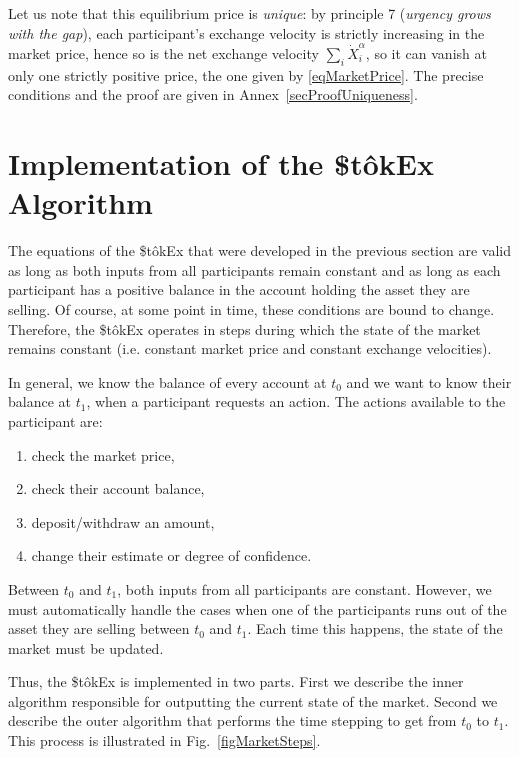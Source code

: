 \documentclass[letterpaper]{article}
\newcommand{\StokEx}{\$t\^{o}kEx}
\begin{document}
Let us note that this equilibrium price is \emph{unique}: by principle 7 (\emph{urgency grows with the gap}), each participant's exchange velocity is strictly increasing in the market price, hence so is the net exchange velocity $\sum_i \dot{X}_i^\alpha$, so it can vanish at only one strictly positive price, the one given by \eqref{eqMarketPrice}. The precise conditions and the proof are given in Annex~\ref{secProofUniqueness}.

\clearpage
\section{Implementation of the \StokEx{} Algorithm}

The equations of the \StokEx{} that were developed in the previous section are valid as long as both inputs from all participants remain constant and as long as each participant has a positive balance in the account holding the asset they are selling. Of course, at some point in time, these conditions are bound to change. Therefore, the \StokEx{} operates in steps during which the state of the market remains constant (i.e. constant market price and constant exchange velocities).

In general, we know the balance of every account at $t_0$ and we want to know their balance at $t_1$, when a participant requests an action. The actions available to the participant are:
\begin{enumerate}
    \item check the market price,
    \item check their account balance,
    \item deposit/withdraw an amount,
    \item change their estimate or degree of confidence.
\end{enumerate}

Between $t_0$ and $t_1$, both inputs from all participants are constant. However, we must automatically handle the cases when one of the participants runs out of the asset they are selling between $t_0$ and $t_1$. Each time this happens, the state of the market must be updated.

Thus, the \StokEx{} is implemented in two parts. First we describe the inner algorithm responsible for outputting the current state of the market. Second we describe the outer algorithm that performs the time stepping to get from $t_0$ to $t_1$. This process is illustrated in Fig.~\ref{figMarketSteps}.
\end{document}
